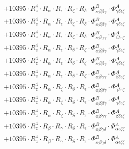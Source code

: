 \documentclass{article}
\begin{document}
\begin{subequations}
\begin{gather}
\begin{array}{c}
 \\[0.2em] 		 + 10395 \cdot R_{z}^{4} \cdot R_{\alpha{}} \cdot R_{\epsilon{}} \cdot R_{\zeta{}} \cdot R_{\delta{}} \cdot \Phi{}^{B}_{\alpha{}\beta{}\beta{}\gamma{}} \cdot \Phi{}^{A}_{\gamma{}\delta{}\epsilon{}\zeta{}} 
 \\[0.2em] 		 + 10395 \cdot R_{z}^{4} \cdot R_{\alpha{}} \cdot R_{\epsilon{}} \cdot R_{\zeta{}} \cdot R_{\delta{}} \cdot \Phi{}^{B}_{\alpha{}\beta{}\beta{}\gamma{}} \cdot \Phi{}^{A}_{\gamma{}\delta{}\epsilon{}\zeta{}} 
 \\[0.2em] 		 + 10395 \cdot R_{z}^{4} \cdot R_{\alpha{}} \cdot R_{\epsilon{}} \cdot R_{\zeta{}} \cdot R_{\delta{}} \cdot \Phi{}^{B}_{\alpha{}\beta{}\gamma{}\gamma{}} \cdot \Phi{}^{A}_{\beta{}\delta{}\epsilon{}\zeta{}} 
 \\[0.2em] 		 + 10395 \cdot R_{z}^{4} \cdot R_{\alpha{}} \cdot R_{\epsilon{}} \cdot R_{\delta{}} \cdot R_{\zeta{}} \cdot \Phi{}^{B}_{\alpha{}\beta{}\beta{}\gamma{}} \cdot \Phi{}^{A}_{\gamma{}\delta{}\epsilon{}\zeta{}} 
 \\[0.2em] 		 + 10395 \cdot R_{z}^{4} \cdot R_{\alpha{}} \cdot R_{\epsilon{}} \cdot R_{\delta{}} \cdot R_{\zeta{}} \cdot \Phi{}^{B}_{\alpha{}\beta{}\beta{}\gamma{}} \cdot \Phi{}^{A}_{\gamma{}\delta{}\epsilon{}\zeta{}} 
 \\[0.2em] 		 + 10395 \cdot R_{z}^{4} \cdot R_{\alpha{}} \cdot R_{\epsilon{}} \cdot R_{\delta{}} \cdot R_{\zeta{}} \cdot \Phi{}^{B}_{\alpha{}\beta{}\gamma{}\gamma{}} \cdot \Phi{}^{A}_{\beta{}\delta{}\epsilon{}\zeta{}} 
 \\[0.2em] 		 + 10395 \cdot R_{z}^{4} \cdot R_{\alpha{}} \cdot R_{\zeta{}} \cdot R_{\delta{}} \cdot R_{\epsilon{}} \cdot \Phi{}^{B}_{\alpha{}\beta{}\beta{}\gamma{}} \cdot \Phi{}^{A}_{\gamma{}\delta{}\epsilon{}\zeta{}} 
 \\[0.2em] 		 + 10395 \cdot R_{z}^{4} \cdot R_{\alpha{}} \cdot R_{\zeta{}} \cdot R_{\delta{}} \cdot R_{\epsilon{}} \cdot \Phi{}^{B}_{\alpha{}\beta{}\beta{}\gamma{}} \cdot \Phi{}^{A}_{\gamma{}\delta{}\epsilon{}\zeta{}} 
 \\[0.2em] 		 + 10395 \cdot R_{z}^{4} \cdot R_{\alpha{}} \cdot R_{\zeta{}} \cdot R_{\delta{}} \cdot R_{\epsilon{}} \cdot \Phi{}^{B}_{\alpha{}\beta{}\gamma{}\gamma{}} \cdot \Phi{}^{A}_{\beta{}\delta{}\epsilon{}\zeta{}} 
 \\[0.2em] 		 + 10395 \cdot R_{z}^{4} \cdot R_{\beta{}} \cdot R_{\gamma{}} \cdot R_{\delta{}} \cdot R_{\epsilon{}} \cdot \Phi{}^{B}_{\alpha{}\beta{}\gamma{}\delta{}} \cdot \Phi{}^{A}_{\alpha{}\epsilon{}\zeta{}\zeta{}} 
 \\[0.2em] 		 + 10395 \cdot R_{z}^{4} \cdot R_{\beta{}} \cdot R_{\gamma{}} \cdot R_{\delta{}} \cdot R_{\epsilon{}} \cdot \Phi{}^{B}_{\alpha{}\beta{}\gamma{}\delta{}} \cdot \Phi{}^{A}_{\alpha{}\epsilon{}\zeta{}\zeta{}} 

\end{array}
\end{gather}
\end{subequations}
\end{document}
